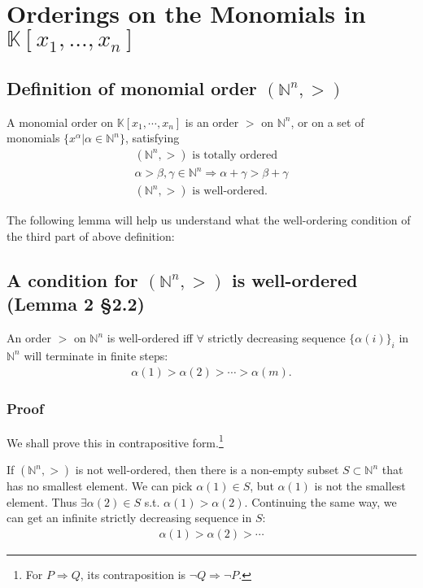 \documentclass[11pt]{book}
\begin{document}
\section{Orderings on the Monomials in $\mathbb{K}\left[x_1, ... , x_n\right]$}
\subsection{Definition of monomial order $(\mathbb{N}^n, >)$}
\label{DefOfMonomialOrder}
A monomial order on $\mathbb{K}[x_1, \cdots, x_n]$ is an order $>$ on $\mathbb{N}^n$, or on a set of monomials $\{x^\alpha | \alpha \in \mathbb{N}^n \}$, satisfying
\begin{eqnarray}
\text{$(\mathbb{N}^n, >)$ is totally ordered} \\
\alpha > \beta, \gamma \in \mathbb{N}^n \Rightarrow \alpha + \gamma > \beta + \gamma \\
\label{wellOrderedMonomialOrder}
\text{$(\mathbb{N}^n, >)$ is well-ordered.}
\end{eqnarray}

The following lemma will help us understand what the well-ordering condition of the third part of above definition:

\subsection{A condition for $(\mathbb{N}^n, >)$ is well-ordered (Lemma 2 \S2.2)}
\label{wellOrderingCondition}
An order $>$ on $\mathbb{N}^n$ is well-ordered iff $\forall$ strictly decreasing sequence $\{\alpha(i)\}_i$ in $\mathbb{N}^n$ will terminate in finite steps:
\begin{eqnarray}
\alpha(1) > \alpha(2) > \cdots > \alpha(m).
\end{eqnarray}

\subsubsection{Proof}
We shall prove this in contrapositive form.\footnote{For $P\Rightarrow Q$, its contraposition is $\lnot Q \Rightarrow \lnot P$.}

If $(\mathbb{N}^n, >)$ is not well-ordered, then there is a non-empty subset $S \subset \mathbb{N}^n$ that has no smallest element.
We can pick $\alpha(1) \in S$, but $\alpha(1)$ is not the smallest element.
Thus $\exists \alpha(2) \in S$ s.t. $\alpha(1) > \alpha(2)$.
Continuing the same way, we can get an infinite strictly decreasing sequence in $S$:
\begin{eqnarray}
\alpha(1) > \alpha(2) > \cdots
\end{eqnarray}
\end{document}
